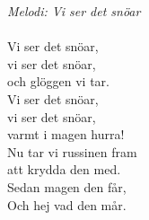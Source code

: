 {\footnotesize\textit{Melodi: Vi ser det snöar}}\\
\\
Vi ser det snöar,\\
vi ser det snöar,\\
och glöggen vi tar.\\
Vi ser det snöar,\\
vi ser det snöar,\\
varmt i magen hurra!\\
Nu tar vi russinen fram\\
att krydda den med.\\
Sedan magen den får,\\
Och hej vad den mår.
